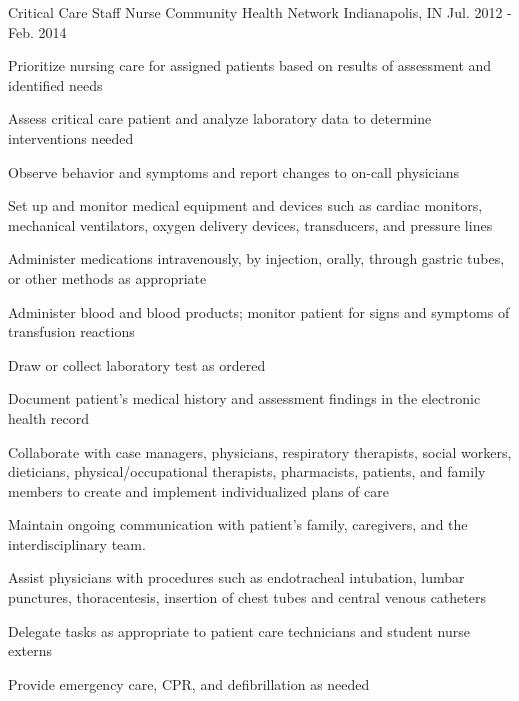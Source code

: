 \begin{cventries}
  \cventry
    {Critical Care Staff Nurse} %
    {Community Health Network} %
    {Indianapolis, IN} %
    {Jul. 2012 - Feb. 2014} %
    {
      \begin{cvitems} %
        \item {Prioritize nursing care for assigned patients based on results of assessment and identified needs}
        \item {Assess critical care patient and analyze laboratory data to determine interventions needed}
        \item {Observe behavior and symptoms and report changes to on-call physicians}
        \item {Set up and monitor medical equipment and devices such as cardiac monitors, mechanical ventilators, oxygen delivery devices, transducers, and pressure lines}
        \item {Administer medications intravenously, by injection, orally, through gastric tubes, or other methods as appropriate}
        \item {Administer blood and blood products; monitor patient for signs and symptoms of transfusion reactions}
        \item {Draw or collect laboratory test as ordered}
        \item {Document patient's medical history and assessment findings in the electronic health record}
        \item {Collaborate with case managers, physicians, respiratory therapists, social workers, dieticians, physical/occupational therapists, pharmacists, patients, and family members to create and implement individualized plans of care}
        \item {Maintain ongoing communication with patient's family, caregivers, and the interdisciplinary team.}
        \item {Assist physicians with procedures such as endotracheal intubation, lumbar punctures, thoracentesis, insertion of chest tubes and central venous catheters}
        \item {Delegate tasks as appropriate to patient care technicians and student nurse externs}
        \item {Provide emergency care, CPR, and defibrillation as needed}
      \end{cvitems}
    }


\end{cventries}
